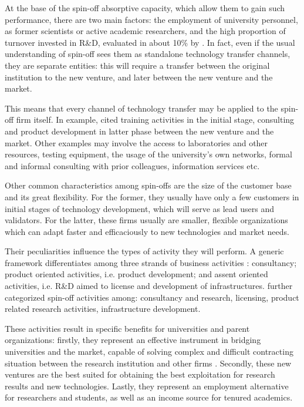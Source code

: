 At the base of the spin-off absorptive capacity, which allow them to gain such performance, there are two main factors: the employment of university personnel, as former scientists or active academic researchers, and the high proportion of turnover invested in R\&D, evaluated in about 10\% by \citet{Perez2003}. In fact, even if the usual understanding of spin-off sees them as standalone technology transfer channels, they are separate entities: this will require a transfer between the original institution to the new venture, and later between the new venture and the market. 

This means that every channel of technology transfer may be applied to the spin-off firm itself. In example, \citet{Perez2003} cited training activities in the initial stage, consulting and product development in latter phase between the new venture and the market. Other examples may involve the access to laboratories and other resources, testing equipment, the usage of the university's own networks, formal and informal consulting with prior colleagues, information services etc.

Other common characteristics among spin-offs are the size of the customer base and its great flexibility. For the former, they usually have only a few customers in initial stages of technology development, which will serve as lead users and validators. For the latter, these firms usually are smaller, flexible organizations which can adapt faster and efficaciously to new technologies and market needs. 

Their peculiarities influence the types of activity they will perform. A generic framework differentiates among three strands of business activities \citep{Mustar2006}: consultancy; product oriented activities, i.e. product development; and assent oriented activities, i.e. R\&D aimed to license and development of infrastructures. \citet{Druilhe2004} further categorized spin-off activities among: consultancy and research, licensing, product related research activities, infrastructure development. 

These activities result in specific benefits for universities and parent organizations: firstly, they represent an effective instrument in bridging universities and the market, capable of solving complex and difficult contracting situation between the research institution and other firms \citep{Rizzo2015}. Secondly, these new ventures are the best suited for obtaining the best exploitation for research results and new technologies. Lastly, they represent an employment alternative for researchers and students, as well as an income source for tenured academics.


